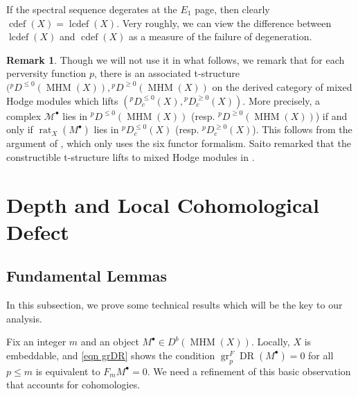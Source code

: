 \documentclass[11pt]{amsart}
\theoremstyle{definition}
\newtheorem{remark}[equation]{Remark}
\theoremstyle{plain}
\DeclareMathOperator{\gr}{gr}
\DeclareMathOperator{\MHM}{MHM}
\DeclareMathOperator{\dr}{DR}
\DeclareMathOperator{\lcdef}{lcdef}
\DeclareMathOperator{\cdef}{cdef}
\DeclareMathOperator{\rat}{rat}
\begin{document}
If the spectral sequence degerates at the $E_1$ page, then clearly $\cdef(X) = \lcdef(X)$. Very roughly, we can view the difference between $\lcdef(X)$ and $\cdef(X)$ as a measure of the failure of degeneration.


\begin{remark}
Though we will not use it in what follows, we remark that for each perversity function $p$, there is an associated t-structure $({}^p D^{\leq 0}(\MHM(X)), {}^p D^{\geq 0}(\MHM(X))$ on the derived category of mixed Hodge modules which lifts  $({}^p D_c^{\leq 0}(X), {}^p D_c^{\geq 0}(X))$. More precisely, a complex $\mathcal{M}^\bullet$ lies in ${}^p D^{\leq 0}(\MHM(X))$ (resp. ${}^p D^{\geq 0}(\MHM(X))$) if and only if $\rat_X(M^\bullet)$ lies in ${}^p D_c^{\leq 0}(X)$ (resp. ${}^p D_c^{\geq 0}(X)$). This follows from the argument of \cite[Theorem $1.2.8$]{kashiwara}, which only uses the six functor formalism. Saito remarked that the constructible t-structure lifts to mixed Hodge modules in \cite[Remark $4.6.2$]{saito 90}.
\end{remark}


\section{Depth and Local Cohomological Defect}\label{depth section}

\subsection{Fundamental Lemmas}
In this subsection, we prove some technical results which will be the key to our analysis.

Fix an integer $m$ and an object $M^\bullet \in D^b(\MHM(X))$. Locally, $X$ is embeddable, and \ref{eqn grDR} shows the condition $\gr_p^F \dr (M^\bullet) = 0$ for all $p \leq m$ is equivalent to $F_m M^\bullet = 0$. We need a refinement of this basic observation that accounts for cohomologies.
\end{document}
